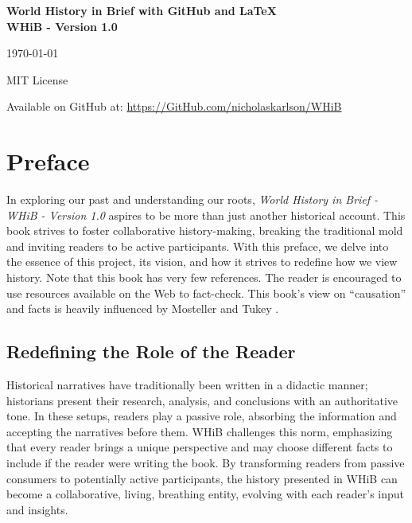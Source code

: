 \documentclass{book}
\begin{document}
\begin{titlepage}
    \centering
    \vspace*{5cm}
    {\Huge\textbf{World History in Brief with GitHub and LaTeX\\ WHiB - Version 1.0}\par}
    \vspace{2cm}
    {\Large\today\par}
    \vspace{1cm}
    {\large MIT License\par}
    \vspace{1cm}
    {Available on GitHub at: \url{https://GitHub.com/nicholaskarlson/WHiB}\par}
\end{titlepage}

\tableofcontents
\cleardoublepage

\chapter*{Preface}
In exploring our past and understanding our roots, \emph{World History in Brief - WHiB - Version 1.0} aspires to be more than just another historical account. This book strives to foster collaborative history-making, breaking the traditional mold and inviting readers to be active participants. With this preface, we delve into the essence of this project, its vision, and how it strives to redefine how we view history. Note that this book has very few references. The reader is encouraged to use resources available on the Web to fact-check. This book's view on ``causation'' and facts is heavily influenced by Mosteller and Tukey \cite{mosteller1977}.

\section*{Redefining the Role of the Reader}
Historical narratives have traditionally been written in a didactic manner; historians present their research, analysis, and conclusions with an authoritative tone. In these setups, readers play a passive role, absorbing the information and accepting the narratives before them. WHiB challenges this norm, emphasizing that every reader brings a unique perspective and may choose different facts to include if the reader were writing the book. By transforming readers from passive consumers to potentially active participants, the history presented in WHiB can become a collaborative, living, breathing entity, evolving with each reader's input and insights.
\end{document}
